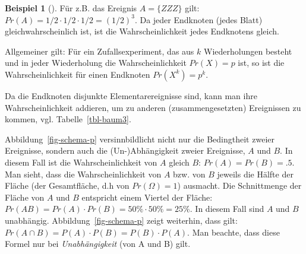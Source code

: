 \documentclass[
  ngerman,
  letterpaper,
  twoside,
  open=any]{scrbook}
\theoremstyle{definition}
\newtheorem{example}{Beispiel}[chapter]
\theoremstyle{plain}
\theoremstyle{definition}
\theoremstyle{definition}
\theoremstyle{remark}
\begin{document}
\begin{example}[]
Für z.B. das Ereignis \(A=\{ZZZ\}\) gilt:
\(Pr(A) = 1/2 \cdot 1/2 \cdot 1/2 = (1/2)^3\). Da jeder Endknoten (jedes
Blatt) gleichwahrscheinlich ist, ist die Wahrscheinlichkeit jedes
Endknotens gleich.

Allgemeiner gilt: Für ein Zufallsexperiment, das aus \(k\)
Wiederholungen besteht und in jeder Wiederholung die Wahrscheinlichkeit
\(Pr(X)=p\) ist, so ist die Wahrscheinlichkeit für einen Endknoten
\(Pr(X^k)=p^k\).

\begin{table}

\caption{\label{tbl-baum3}Ausgewählte Wahrscheinlichkeiten von
Ereignissen im dreifachen Münzwurf}


\end{table}%

Da die Endknoten disjunkte Elementarereignisse sind, kann man ihre
Wahrscheinlichkeit addieren, um zu anderen (zusammengesetzten)
Ereignissen zu kommen, vgl. Tabelle~\ref{tbl-baum3}.

Abbildung~\ref{fig-schema-p} versinnbildlicht nicht nur die Bedingtheit
zweier Ereignisse, sondern auch die (Un-)Abhängigkeit zweier Ereignisse,
\(A\) und \(B\). In diesem Fall ist die Wahrscheinlichkeit von \(A\)
gleich \(B\): \(Pr(A)=Pr(B)=.5\). Man sieht, dass die Wahrscheinlichkeit
von \(A\) bzw. von \(B\) jeweils die Hälfte der Fläche (der
Gesamtfläche, d.h von \(Pr(\Omega)=1\)) ausmacht. Die Schnittmenge der
Fläche von \(A\) und \(B\) entspricht einem Viertel der Fläche:
\(Pr(AB) = Pr(A) \cdot Pr(B) = 50\% \cdot 50\% = 25\%.\) In diesem Fall
sind \(A\) und \(B\) unabhängig. Abbildung~\ref{fig-schema-p} zeigt
weiterhin, dass gilt:
\(Pr(A\cap B) = P(A) \cdot P(B) = P(B) \cdot P(A)\). Man beachte, dass
diese Formel nur bei \emph{Unabhängigkeit} (von A und B) gilt.


\end{example}
\end{document}
